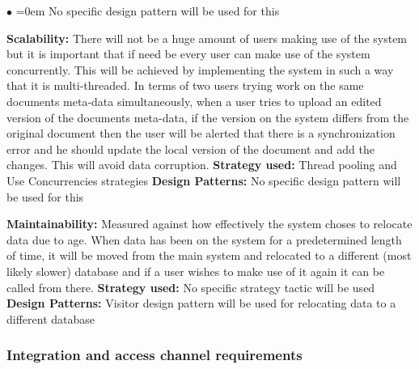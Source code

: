 \documentclass[english]{article}
\begin{document}
\begin{list}{$\bullet$}{\leftmargin=1.5cm \itemindent=0em}
					\newline No specific design pattern will be used for this				
					\item \textbf{Scalability:} There will not be a huge amount of users making use of the system but it is important that if need be every user can make use of the system concurrently. This will be achieved by implementing the system in such a way that it is multi-threaded. In terms of two users trying work on the same documents meta-data simultaneously, when a user tries to upload an edited version of the documents meta-data, if the version on the system differs from the original document then the user will be alerted that there is a synchronization error and he should update the local version of the document and add the changes. This will avoid data corruption.
					\newline \textbf{Strategy used:}
					\newline Thread pooling and Use Concurrencies strategies
					\newline \textbf{Design Patterns:}
					\newline No specific design pattern will be used for this
					\item \textbf{Maintainability:} Measured against how effectively the system choses to relocate data due to age. When data has been on the system for a predetermined length of time, it will be moved from the main system and relocated to a different (most likely slower) database and if a user wishes to make use of it again it can be called from there.
					\newline \textbf{Strategy used:}
					\newline No specific strategy tactic will be used
					\newline \textbf{Design Patterns:}
					\newline Visitor design pattern will be used for relocating data to a different database
				\end{list}
			
			\subsubsection{Integration and access channel requirements}
\end{document}
